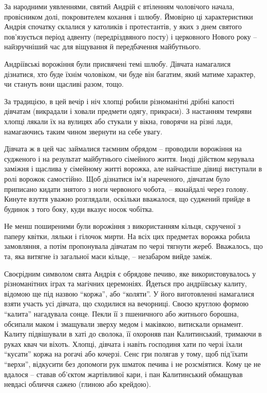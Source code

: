 
За народними уявленнями, святий Андрій є втіленням чоловічого начала,
провісником долі, покровителем кохання і шлюбу. Ймовірно ці характеристики
Андрія спочатку склалися у католиків і протестантів, у яких з днем святого
пов'язується період адвенту (передріздвяного посту) і церковного Нового року –
найзручніший час для віщування й передбачення майбутнього.

Андріївські ворожіння були присвячені темі шлюбу. Дівчата намагалися дізнатися,
хто буде їхнім чоловіком, чи буде він багатим, який матиме характер, чи стануть
вони щасливі разом, тощо. 

За традицією, в цей вечір і ніч хлопці робили різноманітні дрібні капості
дівчатам (викрадали і ховали предмети одягу, прикраси). З настанням темряви
хлопці лякали їх на вулицях або стукали у вікна, говорячи на різні лади,
намагаючись таким чином звернути на себе увагу.

Дівчата ж в цей час займалися таємним обрядом – проводили ворожіння на
судженого і на результат майбутнього сімейного життя. Іноді дійством керувала
заміжня і щаслива у сімейному житті ворожка, але найчастіше дівиці виступали в
ролі ворожок самостійно. Щоб дізнатися ім'я нареченого, дівчатам було приписано
кидати знятого з ноги червоного чобота, – якнайдалі через голову. Кинуте взуття
уважно розглядали, оскільки вважалося, що суджений прийде в будинок з того
боку, куди вказує носок чобітка.

Не менш поширеними були ворожіння з використанням кільця, скрученої з паперу
квітки, ляльки і гілочок мирти. На всіх цих предметах ворожка робила
замовляння, а потім пропонувала дівчатам по черзі тягнути жереб. Вважалось, що
та, яка витягне із загальної маси кільце, – незабаром вийде заміж.


Своєрідним символом свята Андрія є обрядове печиво, яке використовувалось у
різноманітних іграх та магічних церемоніях. Йдеться про андріївську калиту,
відомою ще під назвою \enquote{коржа}, або \enquote{коляти}. У його виготовленні намагалися
взяти участь усі дівчата, що сходилися на вечорниці. Своєю круглою формою
\enquote{калита} нагадувала сонце. Пекли її з пшеничного або житнього борошна, обсипали
маком і змащували зверху медом і маківкою, витискали орнамент. Калиту
підвішували в хаті до сволока, її охороняв пан Калитинський, тримаючи в руках
квач чи віхоть. Хлопці, дівчата і навіть господиня хати по черзі їхали \enquote{кусати}
коржа на рогачі або кочерзі. Сенс гри полягав у тому, щоб під'їхати \enquote{верхи},
відкусити без допомоги рук шматок печива і не розсміятися. Кому це не вдалося –
ставав об'єктом жартівливої кари, і пан Калитинський обмащував невдасі обличчя
сажею (глиною або крейдою).

